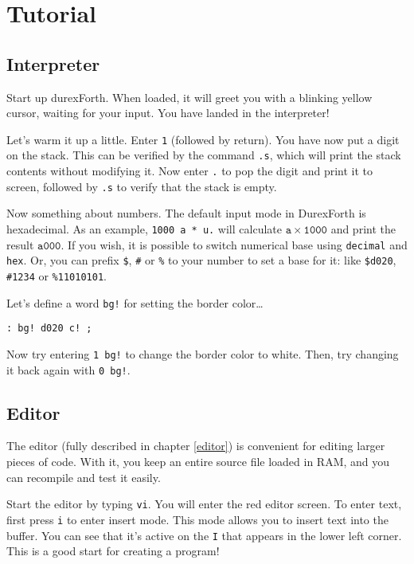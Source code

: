 \chapter{Tutorial}

\section{Interpreter}

Start up durexForth. When loaded, it will greet you with a blinking yellow cursor, waiting for your input. You have landed in the interpreter!

Let's warm it up a little. Enter \texttt{1} (followed by return). You have now put a digit on the stack. This can be verified by the command \texttt{.s}, which will print the stack contents without modifying it. Now enter \texttt{.} to pop the digit and print it to screen, followed by \texttt{.s} to verify that the stack is empty.

Now something about numbers. The default input mode in DurexForth is hexadecimal. As an example, \texttt{1000 a * u.} will calculate $\mathtt{a \times 1000}$ and print the result $\mathtt{a000}$. If you wish, it is possible to switch numerical base using \texttt{decimal} and \texttt{hex}. Or, you can prefix \texttt{\$}, \texttt{\#} or \texttt{\%} to your number to set a base for it: like \texttt{\$d020}, \texttt{\#1234} or \texttt{\%11010101}. 

Let's define a word \texttt{bg!} for setting the border color\ldots 

\begin{verbatim}
: bg! d020 c! ;
\end{verbatim}

Now try entering \texttt{1 bg!} to change the border color to white.
Then, try changing it back again with \texttt{0 bg!}.

\section{Editor}

The editor (fully described in chapter \ref{editor}) is convenient for editing larger pieces of code. With it, you keep an entire source file loaded in RAM, and you can recompile and test it easily.

Start the editor by typing \texttt{vi}. You will enter the red editor screen. To enter text, first press \texttt{i} to enter insert mode. This mode allows you to insert text into the buffer. You can see that it's active on the \texttt{I} that appears in the lower left corner. This is a good start for creating a program!


